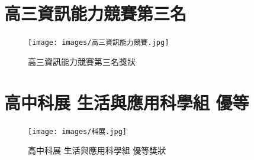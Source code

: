 \documentclass[classical]{einfart}
\begin{document}
\section{高三資訊能力競賽第三名}

\begin{figure}[H]
    \centering
    \texttt{[image: images/高三資訊能力競賽.jpg]}
    \caption{高三資訊能力競賽第三名獎狀}
\end{figure}

\section{高中科展 生活與應用科學組 優等}

\begin{figure}[H]
    \centering
    \texttt{[image: images/科展.jpg]}
    \caption{高中科展 生活與應用科學組 優等獎狀}
\end{figure}
\end{document}
